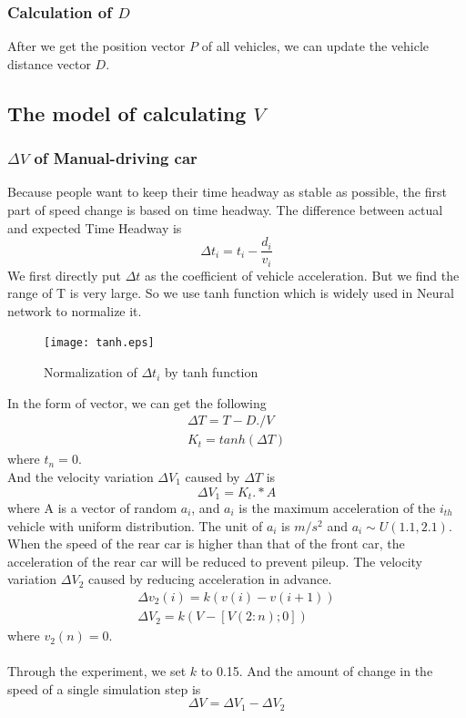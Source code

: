 \documentclass{mcmthesis}
\begin{document}
\subsubsection{Calculation of $D$}
After we get the position vector $P$ of all vehicles, we can update the vehicle distance vector $D$.

\subsection{The model of calculating $V$}
\label{velocity change}
\subsubsection{$\Delta V$ of Manual-driving car}
Because people want to keep their time headway as stable as possible, the first part of speed change is based on time headway. The difference between actual and expected Time Headway is
\begin{equation}
	\Delta t_{i}=t_{i}-\frac{d_{i}}{v_{i}}
\end{equation}
\indent We first directly put $\Delta t$ as the coefficient of vehicle acceleration. But we find the range of T is very large. So we use tanh function which is widely used in Neural network to normalize it.\\
\begin{figure}[H]
	\centerline{\texttt{[image: tanh.eps]}}
	\caption{Normalization of $\Delta t_{i}$ by tanh function}
\end{figure}
\indent In the form of vector, we can get the following
\begin{equation}
\begin{split}
	\Delta T=T-D./V\\
	K_{t}= tanh(\Delta T) 
\end{split}
\end{equation}
where $t_n=0$.\\
\indent And the velocity variation $\Delta V_{1}$ caused by $\Delta T$ is
\begin{equation}
	\Delta V_{1}=K_{t}.*A
\end{equation}
\indent where A is a vector of random $a_{i}$, and $a_{i}$ is the maximum acceleration of the $i_{th}$ vehicle with uniform distribution. The unit of $a_{i}$ is $m/s^{2}$ and $a_{i}\sim U(1.1,2.1)$.\\
\indent When the speed of the rear car is higher than that of the front car, the acceleration of the rear car will be reduced to prevent pileup. The velocity variation $\Delta V_{2}$ caused by reducing acceleration in advance.
\begin{equation}
\begin{split}
	\Delta v_{2}(i)=k(v(i)-v(i+1))\\
	\Delta V_{2}=k(V-[V(2:n);0])
\end{split}
\end{equation}
where $v_2(n)=0$.\\
\\Through the experiment, we set $k$ to 0.15. And the amount of change in the speed of a single simulation step is
\begin{equation}
\Delta V=\Delta V_1-\Delta V_2
\end{equation}
\end{document}

